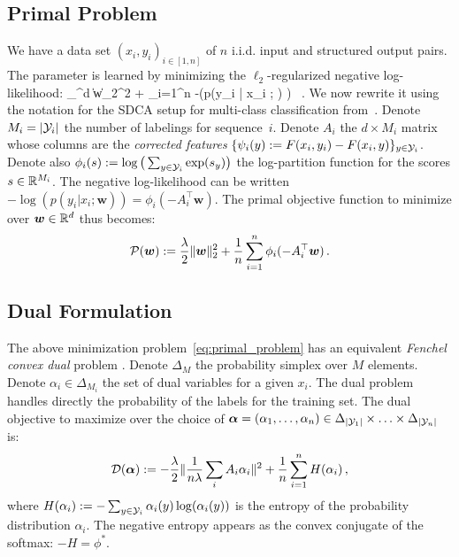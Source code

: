 \subsection{Primal Problem}
We have a data set $(x_i, y_i)_{i \in [1,n]}$ of $n$ i.i.d. input and structured output pairs.
The parameter is learned by minimizing the $\ell_2$-regularized negative log-likelihood:
\beq\label{negative log-likelihood}
	\min_{\bw \in \real^d} \: \| \bm w\|_2^2 +  \sum_{i=1}^{n} -\log\left(p(y_i | x_i ; \bw) \right) \, .
\eeq
We now rewrite it using the notation for the SDCA setup for multi-class classification from~\citet{shalev2016accelerated}.
Denote $M_i = |{\mathcal Y}_i|$ the number of labelings for sequence~$i$.
Denote $A_i$ the $d \times M_i$ matrix whose columns are the \textit{corrected features} $\{\psi_i(y) := F(x_i, y_i) - F(x_i, y)\}_{y \in {\mathcal Y}_i}$.
Denote also $\phi_i(s) := \log \big(\sum_{y \in {\mathcal Y}_i} \exp(s_y)\big)$ the log-partition function for the scores $s \in \mathbb{R}^{M_i}$. The negative log-likelihood can be written $-\log(p(y_i|x_i ;\bm w)) = \phi_i(-A_i^{\top} \bm w)$. The primal objective function to minimize over $\bm w \in \mathbb{R}^d$ thus  becomes:
\begin{equation}
	\label{eq:primal_problem}
	{\mathcal P}(\bm w) := \frac{\lambda}{2}\| \bm w\|_2^2
	+ \frac{1}{n}   \sum_{i=1}^{n} \phi_i(-A_i^{\top} \bm w) \, .
\end{equation}

\subsection{Dual Formulation}
The above minimization problem~\eqref{eq:primal_problem} has an equivalent {\it Fenchel convex dual} problem \citep{lebanon2002boosting}.
Denote $\Delta_{M}$ the probability simplex over $M$ elements.
Denote $\alpha_i \in \Delta_{M_i}$ the set of dual variables for a given $x_i$.
The dual problem handles directly the probability of the labels for the training set.
The dual objective to maximize over the choice of $\boldsymbol{\alpha} = (\alpha_1, \ldots, \alpha_n) \in \Delta_{|{\mathcal Y}_1|} \times \ldots \times \Delta_{|{\mathcal Y}_n|} $ is:
\begin{equation}
	\label{dual problem}
	{\mathcal D}(\boldsymbol{\alpha}) := -\frac{\lambda}{2} \| \frac{1}{n \lambda} \sum_i A_i \alpha_i \|^2
	+ \frac{1}{n} \sum_{i=1}^n H(\alpha_i) \, ,
\end{equation}
where $H(\alpha_i) := - \sum_{y \in {\mathcal Y}_i} \alpha_i(y) \log(\alpha_i(y))$ is the entropy of the probability distribution $\alpha_i$. The negative entropy appears as the convex conjugate of the softmax: $-H = \phi^*$.


